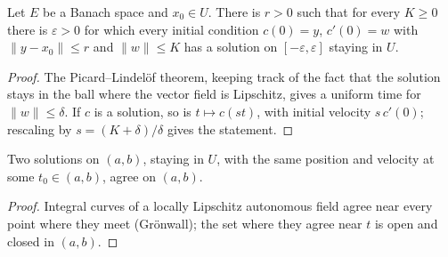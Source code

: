 \begin{theorem}
  \label{thm:quadratic-ode-existence}
  \leanok
  Let $E$ be a Banach space and $x_0 \in U$. There is $r > 0$ such that for every $K \ge 0$ there
  is $\varepsilon > 0$ for which every initial condition $c(0) = y$, $c'(0) = w$ with
  $\|y - x_0\| \le r$ and $\|w\| \le K$ has a solution on $[-\varepsilon, \varepsilon]$ staying in
  $U$.
\end{theorem}

\begin{proof}
  \leanok
  The Picard--Lindel\"of theorem, keeping track of the fact that the solution stays in the ball
  where the vector field is Lipschitz, gives a uniform time for $\|w\| \le \delta$. If $c$ is a
  solution, so is $t \mapsto c(st)$, with initial velocity $s\, c'(0)$; rescaling by
  $s = (K + \delta)/\delta$ gives the statement.
\end{proof}

\begin{theorem}[Uniqueness]
  \label{thm:quadratic-ode-uniqueness}
  \leanok
  Two solutions on $(a, b)$, staying in $U$, with the same position and velocity at some
  $t_0 \in (a, b)$, agree on $(a, b)$.
\end{theorem}

\begin{proof}
  \leanok
  Integral curves of a locally Lipschitz autonomous field agree near every point where they meet
  (Gr\"onwall); the set where they agree near $t$ is open and closed in $(a, b)$.
\end{proof}
